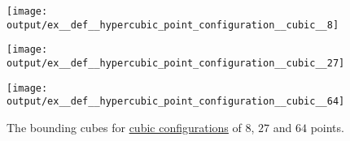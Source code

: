 \begin{example}
\begin{thmenum}
    \begin{figure}[!ht]
    \hfill
      \begin{subcaptionblock}{0.3\textwidth}
        \centering
        \texttt{[image: output/ex\_\_def\_\_hypercubic\_point\_configuration\_\_cubic\_\_8]}
      \end{subcaptionblock}
      \hfill
      \begin{subcaptionblock}{0.3\textwidth}
        \centering
        \texttt{[image: output/ex\_\_def\_\_hypercubic\_point\_configuration\_\_cubic\_\_27]}
      \end{subcaptionblock}
      \hfill
      \begin{subcaptionblock}{0.3\textwidth}
        \centering
        \texttt{[image: output/ex\_\_def\_\_hypercubic\_point\_configuration\_\_cubic\_\_64]}
      \end{subcaptionblock}
      \caption{The bounding cubes for \hyperref[def:hypercubic_point_configuration]{cubic configurations} of \( 8 \), \( 27 \) and \( 64 \) points.}\label{fig:ex:def:hypercubic_point_configuration/cubic}
    \end{figure}
  \end{thmenum}
\end{example}

